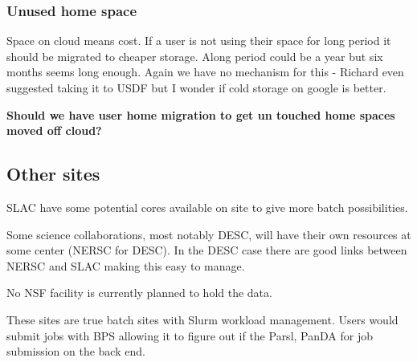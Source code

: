 \subsubsection{Unused home space}
Space on cloud means cost.
If a  user is not using their space for long period it should be migrated to cheaper storage.
Along period could be  a year but six months seems long enough.
Again we have no mechanism for this - Richard even suggested taking it to USDF but I wonder if cold storage on google is better.

{\bf Should we have user home migration to get un touched home spaces moved off cloud?}


\subsection{Other sites}\label{sec:othersites}
SLAC have some potential cores available on site to give more batch possibilities.

Some science collaborations, most notably DESC, will have their own resources at some center (NERSC for DESC).  In the DESC case there are good links between NERSC and SLAC making this easy to manage.

No NSF facility is currently planned to hold the data.

These sites are true batch sites with Slurm workload management. Users would submit jobs with BPS
allowing it to figure out if the Parsl, PanDA for job submission on the back end.


